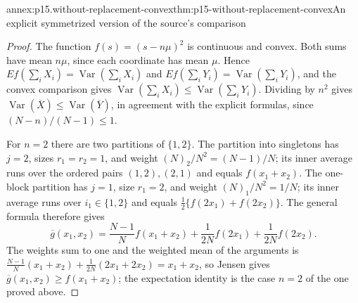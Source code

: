 \begin{annexitem}{annex:p15.without-replacement-convex}{thm:p15-without-replacement-convex}{An explicit symmetrized version of the source's comparison}
\begin{proof}
The function \(f(s)=(s-n\mu)^2\) is continuous and convex. Both sums
have mean \(n\mu\), since each coordinate has mean \(\mu\). Hence
\(Ef(\sum_iX_i)=\operatorname{Var}(\sum_iX_i)\) and
\(Ef(\sum_iY_i)=\operatorname{Var}(\sum_iY_i)\), and the convex comparison
gives \(\operatorname{Var}(\sum_iX_i)\leq\operatorname{Var}(\sum_iY_i)\).
Dividing by \(n^2\) gives
\(\operatorname{Var}(\overline X)\leq\operatorname{Var}(\overline Y)\),
in agreement with the explicit formulas, since \((N-n)/(N-1)\leq1\).

For \(n=2\) there are two partitions of \(\{1,2\}\). The partition into
singletons has \(j=2\), sizes \(r_1=r_2=1\), and weight
\((N)_2/N^2=(N-1)/N\); its inner average runs over the ordered pairs
\((1,2),(2,1)\) and equals \(f(x_1+x_2)\). The one-block partition has
\(j=1\), size \(r_1=2\), and weight \((N)_1/N^2=1/N\); its inner average
runs over \(i_1\in\{1,2\}\) and equals
\(\frac12\{f(2x_1)+f(2x_2)\}\). The general formula therefore gives
\[
 \overline g(x_1,x_2)=\frac{N-1}Nf(x_1+x_2)
 +\frac1{2N}f(2x_1)+\frac1{2N}f(2x_2).
\]
The weights sum to one and the weighted mean of the arguments is
\(\frac{N-1}N(x_1+x_2)+\frac1{2N}(2x_1+2x_2)=x_1+x_2\), so Jensen gives
\(\overline g(x_1,x_2)\geq f(x_1+x_2)\); the expectation identity is the
case \(n=2\) of the one proved above.
\end{proof}
\end{annexitem}

